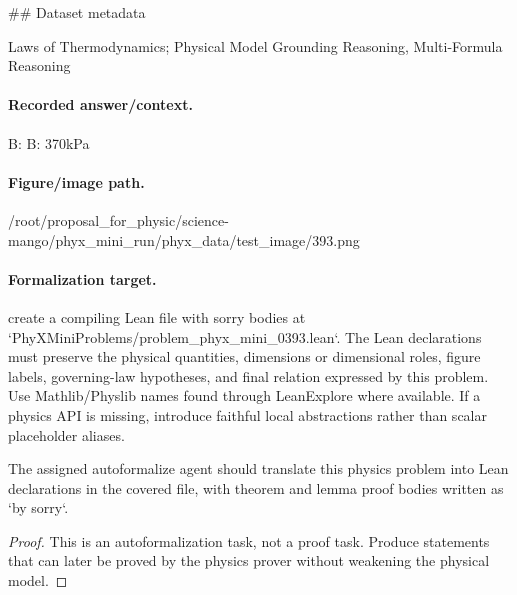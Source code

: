 \#\# Dataset metadata

Laws of Thermodynamics; Physical Model Grounding Reasoning, Multi-Formula Reasoning

\paragraph{Recorded answer/context.}
B: B: 370kPa

\paragraph{Figure/image path.}
/root/proposal\_for\_physic/science-mango/phyx\_mini\_run/phyx\_data/test\_image/393.png

\paragraph{Formalization target.}
create a compiling Lean file with sorry bodies at `PhyXMiniProblems/problem\_phyx\_mini\_0393.lean`. The Lean declarations must preserve the physical quantities, dimensions or dimensional roles, figure labels, governing-law hypotheses, and final relation expressed by this problem.
Use Mathlib/Physlib names found through LeanExplore where available. If a physics API is missing, introduce faithful local abstractions rather than scalar placeholder aliases.

\begin{theorem}
\label{thm:physics:phyx_mini_0393:target}
The assigned autoformalize agent should translate this physics problem into Lean declarations in the covered file, with theorem and lemma proof bodies written as `by sorry`.
\end{theorem}
\begin{proof}
This is an autoformalization task, not a proof task. Produce statements that can later be proved by the physics prover without weakening the physical model.
\end{proof}

